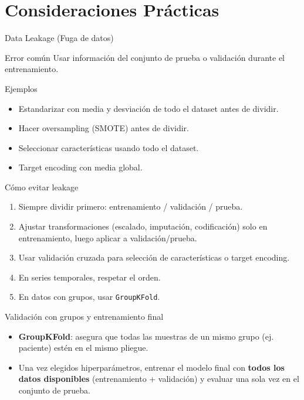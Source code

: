 \documentclass[aspectratio=169, 10pt, xcolor=table]{beamer}
\begin{document}
\section{Consideraciones Prácticas}

\begin{frame}{Data Leakage (Fuga de datos)}
    \begin{alertblock}{Error común}
        Usar información del conjunto de prueba o validación durante el entrenamiento.
    \end{alertblock}
    \begin{exampleblock}{Ejemplos}
        \begin{itemize}
            \item Estandarizar con media y desviación de todo el dataset antes de dividir.
            \item Hacer oversampling (SMOTE) antes de dividir.
            \item Seleccionar características usando todo el dataset.
            \item Target encoding con media global.
        \end{itemize}
    \end{exampleblock}
\end{frame}

\begin{frame}{Cómo evitar leakage}
    \begin{enumerate}
        \item Siempre dividir primero: entrenamiento / validación / prueba.
        \item Ajustar transformaciones (escalado, imputación, codificación) solo en entrenamiento, luego aplicar a validación/prueba.
        \item Usar validación cruzada para selección de características o target encoding.
        \item En series temporales, respetar el orden.
        \item En datos con grupos, usar \texttt{GroupKFold}.
    \end{enumerate}
\end{frame}

\begin{frame}{Validación con grupos y entrenamiento final}
    \begin{itemize}
        \item \textbf{GroupKFold}: asegura que todas las muestras de un mismo grupo (ej. paciente) estén en el mismo pliegue.
        \item Una vez elegidos hiperparámetros, entrenar el modelo final con \textbf{todos los datos disponibles} (entrenamiento + validación) y evaluar una sola vez en el conjunto de prueba.
    \end{itemize}
\end{frame}
\end{document}
